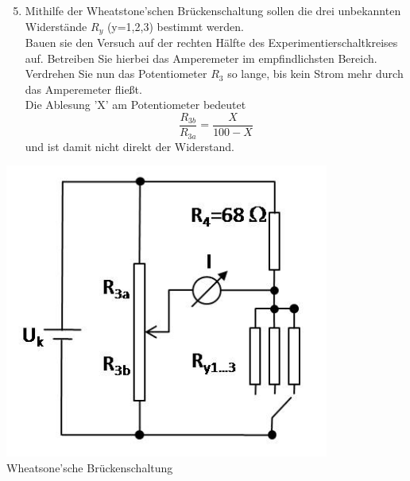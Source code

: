 \begin{minipage}[b]{0.6\textwidth}
\begin{enumerate} \setcounter{enumi}{4}
 \item Mithilfe der Wheatstone'schen Brückenschaltung sollen die drei unbekannten Widerstände $R_y$ (y=1,2,3) bestimmt werden. \\
  Bauen sie den Versuch auf der rechten Hälfte des Experimentierschaltkreises auf. Betreiben Sie hierbei das Amperemeter im empfindlichsten Bereich.\\
  Verdrehen Sie nun das Potentiometer $R_3$ so lange, bis kein Strom mehr durch das Amperemeter fließt.\\
  Die Ablesung 'X' am Potentiometer bedeutet
  \begin{equation}
   \frac{R_{3b}}{R_{3a}} = \frac{X}{100 - X}
  \end{equation}
  und ist damit nicht direkt der Widerstand.
\end{enumerate}
\end{minipage}
%
\begin{minipage}[b]{0.35\textwidth}
 \centering
 \includegraphics[width=0.8\textwidth]{Abbildungen/Wheatstone.jpg}
 \label{fig:Wheatstone}\\
 Wheatsone'sche Brückenschaltung
\end{minipage}


